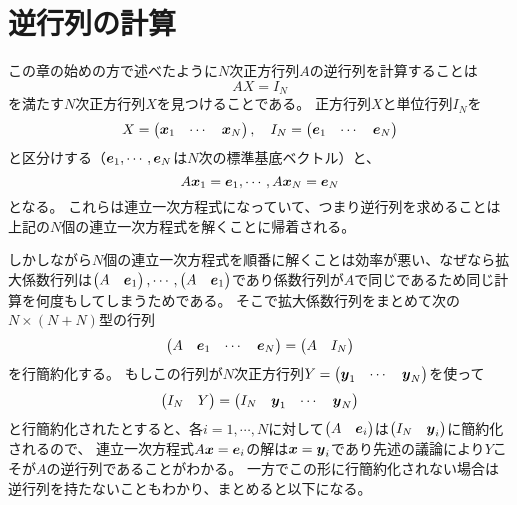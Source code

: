 \section{逆行列の計算}

この章の始めの方で述べたように$N$次正方行列$A$の逆行列を計算することは
$$
A X = I_N
$$
を満たす$N$次正方行列$X$を見つけることである。
正方行列$X$と単位行列$I_N$を
$$
X = \begin{pmatrix}\vb*{x}_1 & \cdots & \vb*{x}_N\end{pmatrix},
\quad I_N = \begin{pmatrix}\vb*{e}_1 & \cdots & \vb*{e}_N\end{pmatrix}
$$
と区分けする（$\vb*{e}_1, \cdots, \vb*{e}_N$は$N$次の標準基底ベクトル）と、
$$
A\vb*{x}_1 = \vb*{e}_1, \cdots, A\vb*{x}_N = \vb*{e}_N
$$
となる。
これらは連立一次方程式になっていて、つまり逆行列を求めることは上記の$N$個の連立一次方程式を解くことに帰着される。

しかしながら$N$個の連立一次方程式を順番に解くことは効率が悪い、なぜなら拡大係数行列は$\begin{pmatrix}A & \vb*{e}_1\end{pmatrix}, \cdots, \begin{pmatrix}A & \vb*{e}_1\end{pmatrix}$であり係数行列が$A$で同じであるため同じ計算を何度もしてしまうためである。
そこで拡大係数行列をまとめて次の$N\times (N+N)$型の行列
$$
\begin{pmatrix}A & \vb*{e}_1 & \cdots & \vb*{e}_N\end{pmatrix} = \begin{pmatrix}A & I_N\end{pmatrix}
$$
を行簡約化する。
もしこの行列が$N$次正方行列$Y = \begin{pmatrix}\vb*{y}_1 & \cdots & \vb*{y}_N\end{pmatrix}$を使って
$$
\begin{pmatrix}I_N & Y\end{pmatrix} = \begin{pmatrix}I_N & \vb*{y}_1 & \cdots & \vb*{y}_N\end{pmatrix}
$$
と行簡約化されたとすると、各$i = 1, \cdots, N$に対して$\begin{pmatrix}A & \vb*{e}_i\end{pmatrix}$は$\begin{pmatrix}I_N & \vb*{y}_i\end{pmatrix}$に簡約化されるので、
連立一次方程式$A\vb*{x} = \vb*{e}_i$の解は$\vb*{x} = \vb*{y}_i$であり先述の議論により$Y$こそが$A$の逆行列であることがわかる。
一方でこの形に行簡約化されない場合は逆行列を持たないこともわかり、まとめると以下になる。

